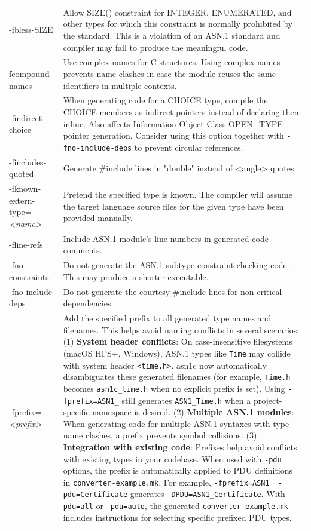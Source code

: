 \documentclass[english,oneside,12pt]{book}
\begin{document}
\begin{longtable}{lp{4in}}
\midrule
{\ttfamily -fbless-SIZE} & {\small Allow SIZE() constraint for INTEGER, ENUMERATED, and other types for which this constraint is normally prohibited by the standard.
This is a violation of an ASN.1 standard and compiler may fail to produce the meaningful code.}\\
{\ttfamily -fcompound-names} & {\small Use complex names for C structures. Using complex names prevents
name clashes in case the module reuses the same identifiers in multiple
contexts.}\\
{\ttfamily -findirect-choice} & {\small When generating code for a CHOICE type, compile the CHOICE
members as indirect pointers instead of declaring them inline. Also affects Information Object Class OPEN\_TYPE pointer generation. Consider
using this option together with \texttt{-fno-include-deps}
to prevent circular references.}\\
{\ttfamily -fincludes-quoted} & {\small Generate \#include lines in "double" instead of <angle> quotes.}\\
{\ttfamily -fknown-extern-type=\emph{<name>}} & {\small Pretend the specified type is known. The compiler will assume
the target language source files for the given type have been provided
manually. }\\
{\ttfamily -fline-refs} & {\small Include ASN.1 module's line numbers in generated code comments.}\\
{\ttfamily -fno-constraints} & {\small Do not generate the ASN.1 subtype constraint checking code. This
may produce a shorter executable.}\\
{\ttfamily -fno-include-deps} & {\small Do not generate the courtesy \#include lines for non-critical dependencies.}\\
{\ttfamily -fprefix=\emph{<prefix>}} & {\small Add the specified prefix to all generated type names and filenames. This helps avoid naming conflicts in several scenarios: (1) \textbf{System header conflicts}: On case-insensitive filesystems (macOS HFS+, Windows), ASN.1 types like \texttt{Time} may collide with system header \texttt{<time.h>}. asn1c now automatically disambiguates these generated filenames (for example, \texttt{Time.h} becomes \texttt{asn1c\_time.h} when no explicit prefix is set). Using \texttt{-fprefix=ASN1\_} still generates \texttt{ASN1\_Time.h} when a project-specific namespace is desired. (2) \textbf{Multiple ASN.1 modules}: When generating code for multiple ASN.1 syntaxes with type name clashes, a prefix prevents symbol collisions. (3) \textbf{Integration with existing code}: Prefixes help avoid conflicts with existing types in your codebase. When used with \texttt{-pdu} options, the prefix is automatically applied to PDU definitions in \texttt{converter-example.mk}. For example, \texttt{-fprefix=ASN1\_ -pdu=Certificate} generates \texttt{-DPDU=ASN1\_Certificate}. With \texttt{-pdu=all} or \texttt{-pdu=auto}, the generated \texttt{converter-example.mk} includes instructions for selecting specific prefixed PDU types.}\\

\end{longtable}
\end{document}
